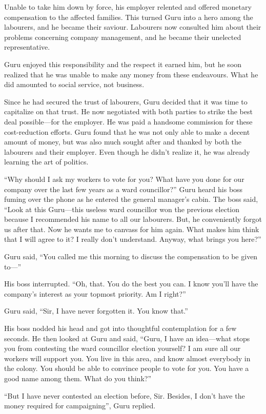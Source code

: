 Unable to take him down by force, his employer relented and offered
monetary compensation to the affected families. This turned Guru into a hero among the
labourers, and he became their saviour. Labourers now consulted him about their problems
concerning company management, and he became their unelected representative.

Guru enjoyed this responsibility and the respect it earned him, but he soon
realized that he was unable to make any money from these endeavours.  What he
did amounted to social service, not business.

Since he had secured the trust of labourers, Guru decided that it was time to
capitalize on that trust. He now negotiated with both parties to strike the best
deal possible—for the employer.  He was paid a handsome commission for these
cost-reduction efforts.  Guru found that he was not only able to make a decent
amount of money, but was also much sought after and thanked by both the
labourers and their employer. Even though he didn't realize it, he was already
learning the art of politics.

“Why should I ask my workers to vote for you? What have you done for our company
over the last few years as a ward councillor?” Guru heard his boss fuming over
the phone as he entered the general manager's cabin. The boss said, “Look at
this Guru—this useless ward councillor won the previous election because I
recommended his name to all our labourers. But, he conveniently forgot us
after that. Now he wants me to canvass for him again. What makes him think that
I will agree to it? I really don't understand. Anyway, what brings you here?”

Guru said, “You called me this morning to discuss the compensation to be
given to—”

His boss interrupted. “Oh, that. You do the best you can. I know you'll have
the company's interest as your topmost priority. Am I right?”

Guru said, “Sir, I have never forgotten it. You know that.”

His boss nodded his head and got into thoughtful contemplation for a few
seconds. He then looked at Guru and said, “Guru, I have an idea—what stops you
from contesting the ward councillor election yourself? I am sure all our workers
will support you. You live in this area, and know almost everybody in
the colony. You should be able to convince people to vote for you. You have a
good name among them. What do you think?”

“But I have never contested an election before, Sir. Besides, I don't
have the money required for campaigning”, Guru replied.

